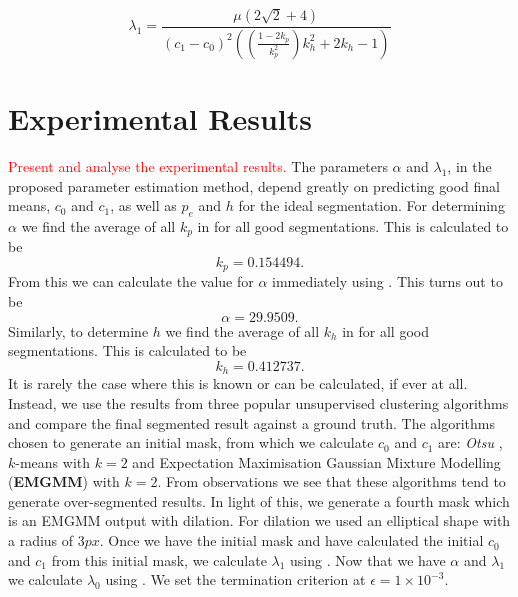 \begin{equation}
	\lambda_1 = \frac{\mu \left( 2\sqrt{2}+4\right)}{(c_1-c_0)^2\left( \left( \frac{1-2k_p}{k_p^2} \right)k_h^2 +2k_h -1 \right)}
	\label{eq:lambda1fromkpandkh}
\end{equation}

\section{Experimental Results}
\label{sec:cvgc_experimentalresults}

\textcolor{red}{Present and analyse the experimental results.} The parameters $\alpha$ and $\lambda_1$, in the proposed parameter estimation method, depend greatly on predicting good final means, $c_0$ and $c_1$, as well as $p_e$ and $h$ for the ideal segmentation. For determining $\alpha$ we find the average of all $k_p$ in  for all good segmentations. This is calculated to be
\begin{equation*}
	k_p = 0.154494.
\end{equation*}
From this we can calculate the value for $\alpha$ immediately using . This turns out to be
\begin{equation}
\alpha = 29.9509.
\end{equation}
Similarly, to determine $h$ we find the average of all $k_h$ in  for all good segmentations. This is calculated to be
\begin{equation*}
	k_h = 0.412737.
\end{equation*}
It is rarely the case where this is known or can be calculated, if ever at all. Instead, we use the results from three popular unsupervised clustering algorithms and compare the final segmented result against a ground truth. The algorithms chosen to generate an initial mask, from which we calculate $c_0$ and $c_1$ are: \textit{Otsu} \citep{Otsu1979}, $k$-means \citep{Kanungo2002} with $k=2$ and Expectation Maximisation Gaussian Mixture Modelling (\textbf{EMGMM}) \citep{Figueiredo2002} with $k=2$. From observations we see that these algorithms tend to generate over-segmented results. In light of this, we generate a fourth mask which is an EMGMM output with dilation. For dilation we used an elliptical shape with a radius of $3px$. Once we have the initial mask and have calculated the initial $c_0$ and $c_1$ from this initial mask, we calculate $\lambda_1$ using . Now that we have $\alpha$ and $\lambda_1$ we calculate $\lambda_0$ using . We set the termination criterion at $\epsilon=1 \times 10^{-3}$.

